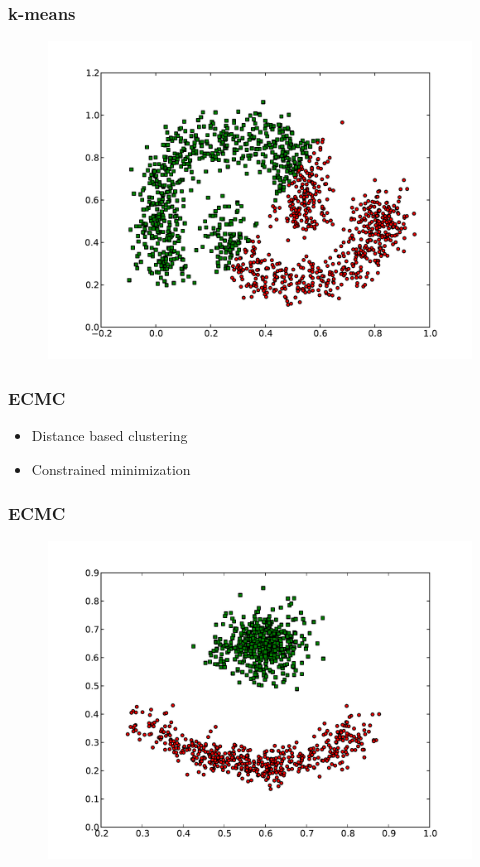 \documentclass{beamer}
\begin{document}
\begin{frame}
\frametitle{k-means}
    \begin{figure}[]
    \includegraphics[scale=0.3]{kmeans_half-moons.pdf}
    \end{figure}
\end{frame}



\begin{frame}
\frametitle{ECMC}
    \begin{itemize}
	\item Distance based clustering
    	\item Constrained minimization
    \end{itemize}
\end{frame}

\begin{frame}
\frametitle{ECMC}
    \begin{figure}[]
    \includegraphics[scale=0.3]{ECMC_red-blue-clusters.pdf}
    \end{figure}
\end{frame}
\end{document}

